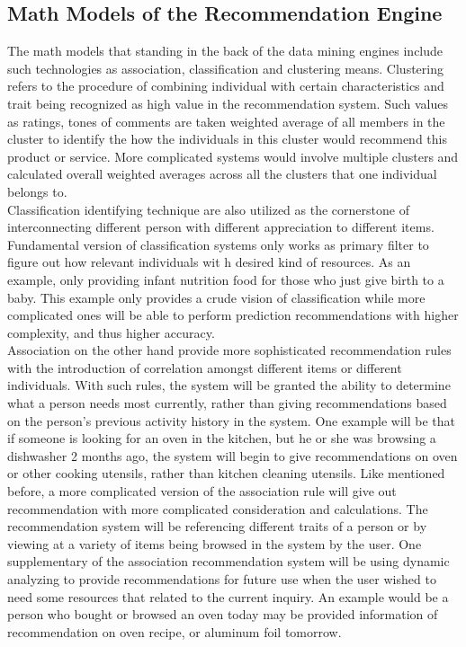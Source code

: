 \documentclass[sigconf]{acmart}
\begin{document}
\subsection{Math Models of the Recommendation Engine}
The math models that standing in the back of the data mining engines include such technologies as association, classification and clustering means. Clustering refers to the procedure of combining individual with certain characteristics and trait being recognized as high value in the recommendation system. Such values as ratings, tones of comments are taken weighted average of all members in the cluster to identify the how the individuals in this cluster would recommend this product or service. More complicated systems would involve multiple clusters and calculated overall weighted averages across all the clusters that one individual belongs to\cite{Schafer2005}.\\
 Classification identifying technique are also utilized as the cornerstone of interconnecting different person with different appreciation to different items. Fundamental version of classification systems only works as primary filter to figure out how relevant individuals wit h desired kind of resources. As an example, only providing infant nutrition food for those who just give birth to a baby. This example only provides a crude vision of classification while more complicated ones will be able to perform prediction recommendations with higher complexity, and thus higher accuracy\cite{Rountree2005}.\\
Association on the other hand provide more sophisticated recommendation rules with the introduction of correlation amongst different items or different individuals.  With such rules, the system will be granted the ability to determine what a person needs most currently, rather than giving recommendations based on the person's previous activity history in the system. One example will be that if someone is looking for an oven in the kitchen, but he or she was browsing a dishwasher 2 months ago, the system will begin to give recommendations on oven or other cooking utensils, rather than kitchen cleaning utensils. Like mentioned before, a more complicated version of the association rule will give out recommendation with more complicated consideration and calculations. The recommendation system will be referencing different traits of a person or by viewing at a variety of items being browsed in the system by the user. One supplementary of the association recommendation system will be using dynamic analyzing to provide recommendations for future use when the user wished to need some resources that related to the current inquiry. An example would be a person who bought or browsed an oven today may be provided information of recommendation on oven recipe, or aluminum foil tomorrow.\\
\end{document}
